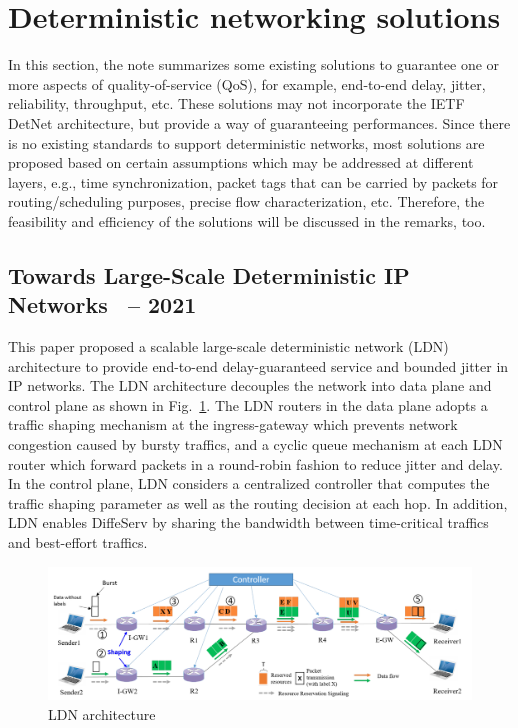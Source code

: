 \documentclass[12pt]{article}
\begin{document}
\section{Deterministic networking solutions}
In this section, the note summarizes some existing solutions to guarantee one or more aspects of quality-of-service (QoS), for example, end-to-end delay, jitter, reliability, throughput, etc. These solutions may not incorporate the IETF DetNet architecture, but provide a way of guaranteeing performances. Since there is no existing standards to support deterministic networks, most solutions are proposed based on certain assumptions which may be addressed at different layers, e.g., time synchronization, packet tags that can be carried by packets for routing/scheduling purposes, precise flow characterization, etc. Therefore, the feasibility and efficiency of the solutions will be discussed in the remarks, too.

\subsection{Towards Large-Scale Deterministic IP Networks~\cite{liu2021towards} -- 2021}

This paper proposed a scalable large-scale deterministic network (LDN) architecture to provide end-to-end delay-guaranteed service and bounded jitter in IP networks.  The LDN architecture decouples the network into data plane and control plane as shown in Fig.~\ref{fig:LDN}. The LDN routers in the data plane adopts a traffic shaping mechanism at the ingress-gateway which prevents network congestion caused by bursty traffics, and a cyclic queue mechanism at each LDN router which forward packets in a round-robin fashion to reduce jitter and delay. In the control plane, LDN considers a centralized controller that computes the traffic shaping parameter as well as the routing decision at each hop. In addition, LDN enables DiffeServ by sharing the bandwidth between time-critical traffics and best-effort traffics.
\begin{figure}
    \centering
    \includegraphics[width = \columnwidth]{Figures/LDN.png}
    \caption{LDN architecture}
    \label{fig:LDN}
\end{figure}
\end{document}
